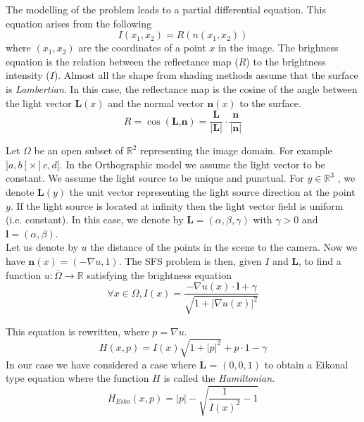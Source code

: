 \noindent The modelling of the problem leads to a partial differential equation. This equation arises from the following
\begin{equation}
I(x_1,x_2) = R(n(x_1,x_2))
\end{equation}	
where $(x_1,x_2)$ are the coordinates of a point $x$ in the image. The brighness equation is the relation between the reflectance map ($R$) to the brightness intensity ($I$). Almost all the shape from shading methods assume that the surface is \emph{Lambertian}. In this case, the reflectance map is the cosine of the angle between the light vector $\textbf{L}(x)$ and the normal vector $\textbf{n}(x)$ to the surface.
\begin{equation}
R = \cos(\textbf{L,n}) = \frac{\textbf{L}}{\lvert\textbf{L}\rvert}\cdot \frac{\textbf{n}}{\lvert\textbf{n}\rvert}
\end{equation}

\noindent Let $\Omega$ be an open subset of $ \mathbb{R}^2$ representing the image domain. For example $]a,b[ \times ]c,d[$.
\noindent In the Orthographic model we assume the light vector to be constant. We assume the light source to be unique and punctual. For $y \in \mathbb{R}^3$ , we denote $\mathbf{L}(y)$ the unit vector representing the light source direction at the point $y$. If the light source is located at infinity then the light vector field is uniform (i.e. constant). In this case, we denote by $\textbf{L} = (\alpha, \beta, \gamma)$ with $\gamma > 0$ and $\textbf{l} = (\alpha ,\beta)$. \\

\noindent Let us denote by $u$ the distance of the points in the scene to the camera. Now we have $\mathbf{n}(x) = (-\nabla u, 1)$. The SFS problem is then, given $I$ and \textbf{L}, to find a function $ u : \bar{\Omega} \rightarrow \mathbb{R}$ satisfying the brightness equation
\begin{equation}
	\forall x \in \Omega,  I(x) = \frac{-\nabla u(x) \cdot \mathbf{l} + \gamma}{\sqrt{1 + \lvert \nabla u(x) \rvert ^2}}
\end{equation}

\noindent This equation is rewritten, where $ p = \nabla u $. 
\begin{equation}
	H(x,p) = I(x)\sqrt{1+\lvert p \rvert^2} + p\cdot 1 - \gamma
\end{equation}
\noindent In our case we have considered a case where \textbf{L} = $(0,0,1)$ to obtain a Eikonal type equation where the function $H$ is called the \emph{Hamiltonian}.
\begin{equation}
	H_{Eiko} (x,p) = \lvert p \rvert - \sqrt{\frac{1}{I(x)^2} - 1}
\end{equation}

